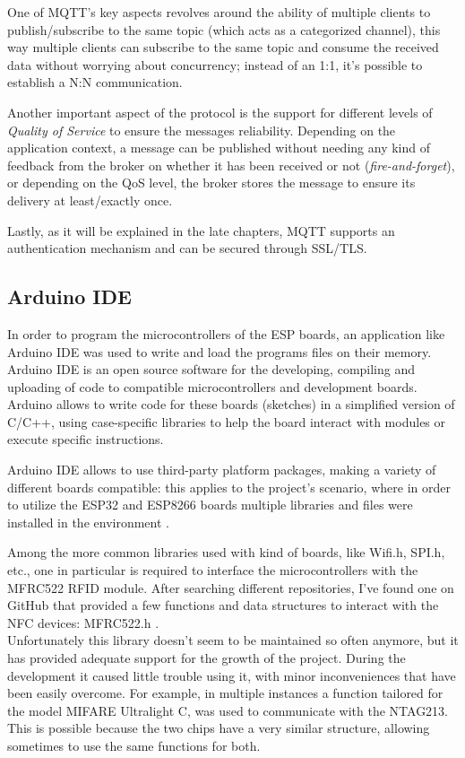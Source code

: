 \documentclass[target=bach,aauheader=,style=]{thud}
\begin{document}
One of MQTT's key aspects revolves around the ability of multiple clients to publish/subscribe to the same topic (which acts as a categorized channel), this way multiple clients can subscribe to the same topic and consume the received data without worrying about concurrency; instead of an 1:1, it's possible to establish a N:N communication.

Another important aspect of the protocol is the support for different levels of \emph{Quality of Service} to ensure the messages reliability. Depending on the application context, a message can be published without needing any kind of feedback from the broker on whether it has been received or not (\emph{fire-and-forget}), or depending on the QoS level, the broker stores the message to ensure its delivery at least/exactly once.

Lastly, as it will be explained in the late chapters, MQTT supports an authentication mechanism and can be secured through SSL/TLS.

\subsection{Arduino IDE}

In order to program the microcontrollers of the ESP boards, an application like Arduino IDE was used to write and load the programs files on their memory.\\

Arduino IDE is an open source software for the developing, compiling and uploading of code to compatible microcontrollers and development boards.
Arduino allows to write code for these boards (sketches) in a simplified version of C/C++, using case-specific libraries to help the board interact with modules or execute specific instructions. 

Arduino IDE allows to use third-party platform packages, making a variety of different boards compatible: this applies to the project's scenario, where in order to utilize the ESP32 and ESP8266 boards multiple libraries and files were installed in the environment \cite{esp_install_arduino}.

Among the more common libraries used with kind of boards, like Wifi.h, SPI.h, etc., one in particular is required to interface the microcontrollers with the MFRC522 RFID module. After searching different repositories, I've found one on GitHub that provided a few functions and data structures to interact with the NFC devices: MFRC522.h \cite{mfr522library}.\\
Unfortunately this library doesn't seem to be maintained so often anymore, but it has provided adequate support for the growth of the project. During the development it caused little trouble using it, with minor inconveniences that have been easily overcome. For example, 
in multiple instances a function tailored for the model MIFARE Ultralight C, was used to communicate with the NTAG213. This is possible because the two chips have a very similar structure, allowing sometimes to use the same functions for both.
\end{document}
